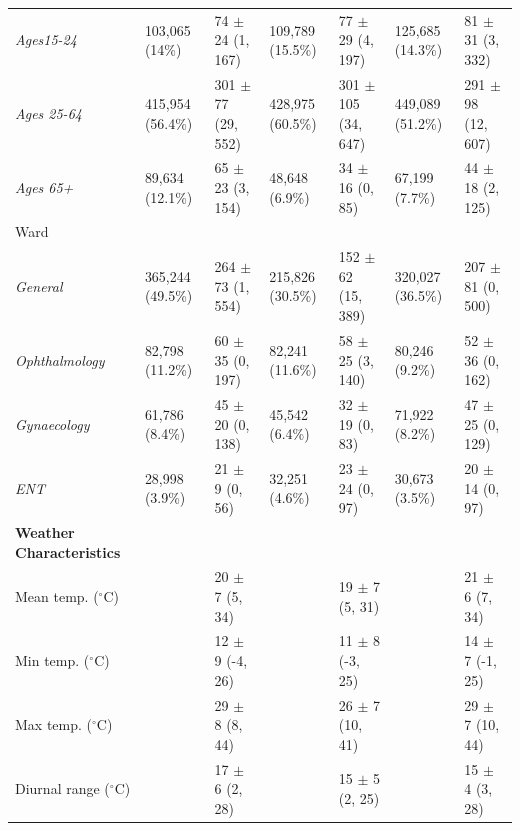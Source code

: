 \begin{longtable}[t]{lllllll}
\hspace{2em}\textit{Ages15-24} & 103,065 (14\%) & 74 $\pm$ 24 (1, 167) & 109,789 (15.5\%) & 77 $\pm$ 29 (4, 197) & 125,685 (14.3\%) & 81 $\pm$ 31 (3, 332)\\
\hspace{2em}\textit{Ages 25-64} & 415,954 (56.4\%) & 301 $\pm$ 77 (29, 552) & 428,975 (60.5\%) & 301 $\pm$ 105 (34, 647) & 449,089 (51.2\%) & 291 $\pm$ 98 (12, 607)\\
\hspace{2em}\textit{Ages 65+} & 89,634 (12.1\%) & 65 $\pm$ 23 (3, 154) & 48,648 (6.9\%) & 34 $\pm$ 16 (0, 85) & 67,199 (7.7\%) & 44 $\pm$ 18 (2, 125)\\
\hspace{1em}Ward &  &  &  &  &  & \\
\hspace{2em}\textit{General} & 365,244 (49.5\%) & 264 $\pm$ 73 (1, 554) & 215,826 (30.5\%) & 152 $\pm$ 62 (15, 389) & 320,027 (36.5\%) & 207 $\pm$ 81 (0, 500)\\
\hspace{2em}\textit{Ophthalmology} & 82,798 (11.2\%) & 60 $\pm$ 35 (0, 197) & 82,241 (11.6\%) & 58 $\pm$ 25 (3, 140) & 80,246 (9.2\%) & 52 $\pm$ 36 (0, 162)\\
\hspace{2em}\textit{Gynaecology} & 61,786 (8.4\%) & 45 $\pm$ 20 (0, 138) & 45,542 (6.4\%) & 32 $\pm$ 19 (0, 83) & 71,922 (8.2\%) & 47 $\pm$ 25 (0, 129)\\
\hspace{2em}\textit{ENT} & 28,998 (3.9\%) & 21 $\pm$ 9 (0, 56) & 32,251 (4.6\%) & 23 $\pm$ 24 (0, 97) & 30,673 (3.5\%) & 20 $\pm$ 14 (0, 97)\\
\textbf{Weather Characteristics} &  &  &  &  &  & \\
\hspace{1em}Mean temp. ($^\circ$C) &  & 20 $\pm$ 7 (5, 34) &  & 19 $\pm$ 7 (5, 31) &  & 21 $\pm$ 6 (7, 34)\\
\hspace{1em}Min temp. ($^\circ$C) &  & 12 $\pm$ 9 (-4, 26) &  & 11 $\pm$ 8 (-3, 25) &  & 14 $\pm$ 7 (-1, 25)\\
\hspace{1em}Max temp. ($^\circ$C) &  & 29 $\pm$ 8 (8, 44) &  & 26 $\pm$ 7 (10, 41) &  & 29 $\pm$ 7 (10, 44)\\
\hspace{1em}Diurnal range ($^\circ$C) &  & 17 $\pm$ 6 (2, 28) &  & 15 $\pm$ 5 (2, 25) &  & 15 $\pm$ 4 (3, 28)\\

\end{longtable}
